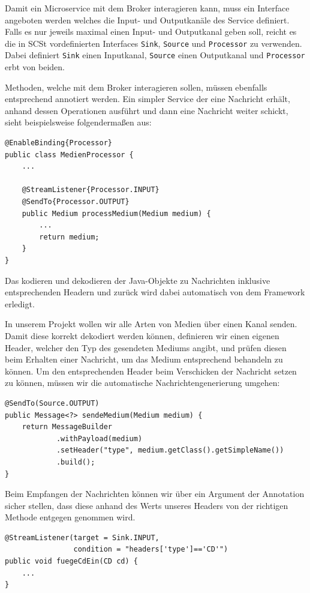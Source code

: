 \documentclass{article}
\begin{document}
Damit ein Microservice mit dem Broker interagieren kann, muss ein Interface angeboten werden welches die Input- und Outputkanäle des Service definiert.
Falls es nur jeweils maximal einen Input- und Outputkanal geben soll, reicht es die in SCSt vordefinierten Interfaces \texttt{Sink}, \texttt{Source} und \texttt{Processor} zu verwenden.
Dabei definiert \texttt{Sink} einen Inputkanal, \texttt{Source} einen Outputkanal und \texttt{Processor} erbt von beiden.

Methoden, welche mit dem Broker interagieren sollen, müssen ebenfalls entsprechend annotiert werden.
Ein simpler Service der eine Nachricht erhält, anhand dessen Operationen ausführt und dann eine Nachricht weiter schickt, sieht beispielsweise folgendermaßen aus:
\begin{lstlisting}
@EnableBinding{Processor}
public class MedienProcessor {
    ...

    @StreamListener{Processor.INPUT}
    @SendTo{Processor.OUTPUT}
    public Medium processMedium(Medium medium) {
        ...
        return medium;
    }
}
\end{lstlisting}

Das kodieren und dekodieren der Java-Objekte zu Nachrichten inklusive entsprechenden Headern und zurück wird dabei automatisch von dem Framework erledigt.

In unserem Projekt wollen wir alle Arten von Medien über einen Kanal senden.
Damit diese korrekt dekodiert werden können, definieren wir einen eigenen Header, welcher den Typ des gesendeten Mediums angibt, und prüfen diesen beim Erhalten einer Nachricht, um das Medium entsprechend behandeln zu können.
Um den entsprechenden Header beim Verschicken der Nachricht setzen zu können, müssen wir die automatische Nachrichtengenerierung umgehen:
\begin{lstlisting}
@SendTo(Source.OUTPUT)
public Message<?> sendeMedium(Medium medium) {
    return MessageBuilder
            .withPayload(medium)
            .setHeader("type", medium.getClass().getSimpleName())
            .build();
}
\end{lstlisting}

Beim Empfangen der Nachrichten können wir über ein Argument der Annotation sicher stellen, dass diese anhand des Werts unseres Headers von der richtigen Methode entgegen genommen wird.
\begin{lstlisting}
@StreamListener(target = Sink.INPUT,
                condition = "headers['type']=='CD'")
public void fuegeCdEin(CD cd) {
    ...
}
\end{lstlisting}
\end{document}
